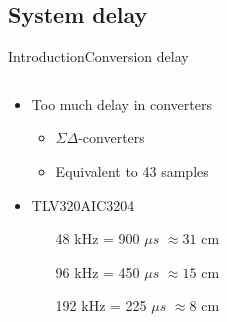 \subsection{System delay}
\begin{frame}{Introduction}{Conversion delay}
	\begin{columns}
		\begin{column}{0.4\textwidth}
		\begin{itemize}
		\item Too much delay in converters
				\begin{itemize}
				\item $\Sigma \Delta$-converters
				\item Equivalent to 43 samples						
				\end{itemize}
		\item TLV320AIC3204
				\begin{itemize}
				\item[\textcolor{MATLABred}{48 kHz}]= 900 $\mu s$ $\approx 31$ cm
				\item[\textcolor{MATLAByellow}{96 kHz}]= 450 $\mu s$ $\approx 15$ cm
				\item[\textcolor{MATLABpurple}{192 kHz}]= 225 $\mu s$ $\approx 8$ cm
				\end{itemize}	
		\end{itemize}
		\end{column}
		\begin{column}{0.6\textwidth} 
		\begin{center}
		
		\end{center}
		\end{column}
	\end{columns}
\end{frame}

